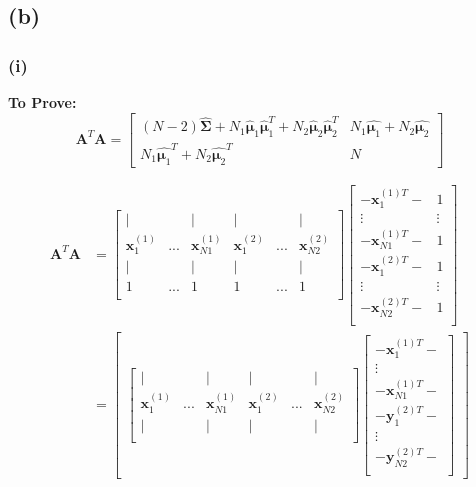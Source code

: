 \documentclass[11pt]{article}
\begin{document}
\subsection*{(b)}
\subsubsection*{(i)}
\noindent \textbf{To Prove:}
$$\pmb{A}^T\pmb{A}=\begin{bmatrix}
(N-2)\hat{\pmb{\Sigma}}+N_1\hat{\pmb{\mu}}_1\hat{\pmb{\mu}}_1^T+N_2\hat{\pmb{\mu}}_2\hat{\pmb{\mu}}_2^T & N_1\hat{\pmb{\mu}_1}+N_2\hat{\pmb{\mu}_2}\\
N_1\hat{\pmb{\mu}_1}^T+N_2\hat{\pmb{\mu}_2}^T & N
\end{bmatrix}$$

\begin{equation}
\begin{split}
\pmb{A}^T\pmb{A}&=\begin{bmatrix}
|&&|&|&&|\\
\pmb{x}^{(1)}_1&...&\pmb{x}^{(1)}_{N1}&\pmb{x}^{(2)}_1&...&\pmb{x}^{(2)}_{N2}\\
|&&|&|&&|\\
1&...&1&1&...&1\\
\end{bmatrix}\begin{bmatrix}
-\pmb{x}^{(1)T}_1-& 1\\
\vdots&\vdots\\
-\pmb{x}^{(1)T}_{N1}-& 1\\
-\pmb{x}^{(2)T}_1-& 1\\
\vdots&\vdots\\
-\pmb{x}^{(2)T}_{N2}-& 1\\
\end{bmatrix}\\
&=\begin{bmatrix}
\begin{bmatrix}
|&&|&|&&|\\
\pmb{x}^{(1)}_1&...&\pmb{x}^{(1)}_{N1}&\pmb{x}^{(2)}_1&...&\pmb{x}^{(2)}_{N2}\\
|&&|&|&&|\\
\end{bmatrix}\begin{bmatrix}
-\pmb{x}^{(1)T}_1-\\
\vdots\\
-\pmb{x}^{(1)T}_{N1}-\\
-\pmb{y}^{(2)T}_1-\\
\vdots\\
-\pmb{y}^{(2)T}_{N2}-\\

\end{bmatrix}
\end{bmatrix}
\end{split}
\end{equation}
\end{document}
